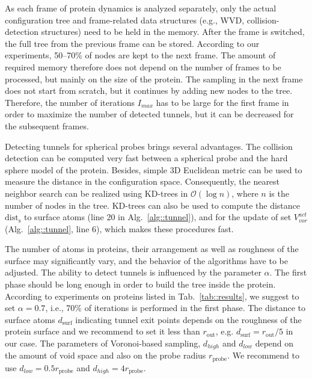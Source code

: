 \documentclass{llncs}
\def\Imax{I_{max}} %
\def\dists{\mathrm{dist}_{\mathrm{s}}}
\def\VVA{V_{vor}^{act}}
\def\da{d_{high}}
\def\db{d_{low}}
\def\probe{r_{\mathrm{probe}}}
\def\gprobe{r_{\mathrm{out}}}
\def\ths{d_\mathrm{surf}}
\begin{document}
As each frame of protein dynamics is analyzed separately, only the actual configuration tree and frame-related data structures 
(e.g., WVD, collision-detection structures) need to be held in the memory.
After the frame is switched, the full tree from the previous frame can be stored.
According to our experiments, 50--70\% of nodes are kept to the next frame.
The amount of required memory therefore does not depend on the number of frames to be processed, but mainly on the size of the protein.
The sampling in the next frame does not start from scratch, but it continues by adding new nodes to the tree.
Therefore, the number of iterations $\Imax$ has to be large for the first frame in order to maximize the number of detected tunnels, but it can 
be decreased for the subsequent frames.

Detecting tunnels for spherical probes brings several advantages.
The collision detection can be computed very fast between a spherical probe and the hard sphere model of the protein.
Besides, simple 3D Euclidean metric can be used to measure the distance in the configuration space.
Consequently, the nearest neighbor search can be realized using KD-trees in $\mathcal{O}(\log n)$, where $n$ is the number of 
nodes in the tree.
KD-trees can also be used to compute the distance $\dists$ to surface atoms 
(line 20 in Alg.~\ref{alg::tunnel}), and for the update of set $\VVA$ (Alg.~\ref{alg::tunnel}, line 6), 
which makes these procedures fast.
   

The number of atoms in proteins, their arrangement as well as roughness of the surface may significantly vary, 
       and the behavior of the algorithms have to be adjusted.
The ability to detect tunnels is influenced by the parameter $\alpha$.
The first phase should be long enough in order to build the tree inside the protein.
According to experiments on proteins listed in Tab.~\ref{tab::results}, 
we suggest to set $\alpha=0.7$, i.e., 70\% of iterations is performed in the first phase.
The distance to surface atoms $\ths$ indicating tunnel exit points depends on the roughness of the protein surface and we recommend
to set it less than $\gprobe$, e.g. $\ths=\gprobe/5$ in our case.
The parameters of Voronoi-based sampling, $\da$ and $\db$ depend on the amount of void space and also on the probe radius $\probe$.
We recommend to use $\db=0.5\probe$ and $\da=4\probe$.
\end{document}
